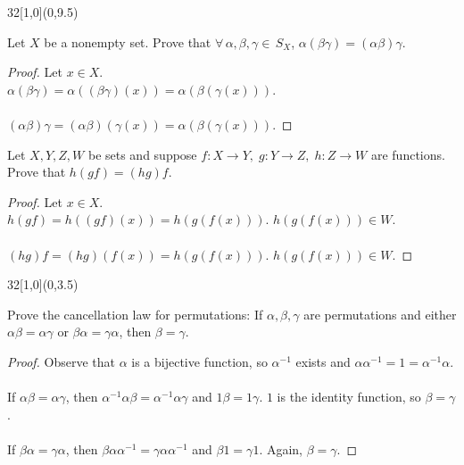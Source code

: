 \documentclass[12pt]{article}
\newenvironment{exercise}[2]{\begin{textblock}{32}[1,0](0,#2)\noindent#1\end{textblock}}{\vspace{1in}}
\begin{document}
\begin{exercise}{1.3}{9.5}
	{\noindent}Let $X$ be a nonempty set. Prove that $\forall\, \alpha, \beta, \gamma\in \, S_X$, $\alpha(\beta\gamma)=(\alpha\beta)\gamma$.
	\bigskip

	\begin{proof}
    Let $x\in X$.\\$\alpha(\beta\gamma) = \alpha((\beta\gamma)(x)) = \alpha(\beta(\gamma(x)))$.\\
		\\
    $(\alpha\beta)\gamma = (\alpha\beta)(\gamma(x)) = \alpha(\beta(\gamma(x)))$.
  \end{proof}
	\vspace{1in}

	{\noindent}Let $X,Y,Z,W$ be sets and suppose $f:X\to Y,\; g:Y\to Z,\; h:Z\to W$ are functions. Prove that $h(gf)=(hg)f$.
	\bigskip

	\begin{proof}
		Let $x\in X$.\\$h(gf) = h((gf)(x)) = h(g(f(x)))$. $h(g(f(x)))\in W$.\\
		\\
		$(hg)f = (hg)(f(x)) = h(g(f(x)))$. $h(g(f(x)))\in W$.
	\end{proof}
\end{exercise}


\begin{exercise}{1.6}{3.5}
	{\noindent}Prove the cancellation law for permutations: If $\alpha, \beta, \gamma$ are permutations and either $\alpha\beta=\alpha\gamma$ or $\beta\alpha=\gamma\alpha$, then $\beta=\gamma$.
	\bigskip

	\begin{proof}
		Observe that $\alpha$ is a bijective function, so $\alpha^{-1}$ exists and $\alpha\alpha^{-1} = 1 = \alpha^{-1}\alpha$.
		\\
		\\
		If $\alpha\beta=\alpha\gamma$, then $\alpha^{-1}\alpha\beta=\alpha^{-1}\alpha\gamma$ and $1\beta=1\gamma$. $1$ is the identity function, so $\beta=\gamma$.
		\\
		\\
		If $\beta\alpha=\gamma\alpha$, then $\beta\alpha\alpha^{-1}=\gamma\alpha\alpha^{-1}$ and $\beta 1=\gamma 1$. Again, $\beta=\gamma$.
	\end{proof}
\end{exercise}

\newpage
\end{document}
